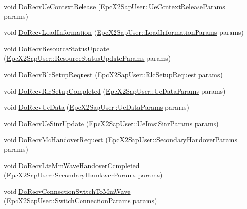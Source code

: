 \begin{DoxyCompactItemize}
\item 
void \hyperlink{classns3_1_1LteEnbRrc_acd8dc1935301185b71e736d04128d1fd}{Do\+Recv\+Ue\+Context\+Release} (\hyperlink{structns3_1_1EpcX2Sap_1_1UeContextReleaseParams}{Epc\+X2\+Sap\+User\+::\+Ue\+Context\+Release\+Params} params)
\item 
void \hyperlink{classns3_1_1LteEnbRrc_ad36a17ef9e85820d69f5499eba96cb77}{Do\+Recv\+Load\+Information} (\hyperlink{structns3_1_1EpcX2Sap_1_1LoadInformationParams}{Epc\+X2\+Sap\+User\+::\+Load\+Information\+Params} params)
\item 
void \hyperlink{classns3_1_1LteEnbRrc_a517db4a5ef935e5eeed76e6674b85c58}{Do\+Recv\+Resource\+Status\+Update} (\hyperlink{structns3_1_1EpcX2Sap_1_1ResourceStatusUpdateParams}{Epc\+X2\+Sap\+User\+::\+Resource\+Status\+Update\+Params} params)
\item 
void \hyperlink{classns3_1_1LteEnbRrc_a03259d4d0c4bfc816ef3c71ca0a84faf}{Do\+Recv\+Rlc\+Setup\+Request} (\hyperlink{structns3_1_1EpcX2Sap_1_1RlcSetupRequest}{Epc\+X2\+Sap\+User\+::\+Rlc\+Setup\+Request} params)
\item 
void \hyperlink{classns3_1_1LteEnbRrc_a26774965bd445cebd9703472d1e87cae}{Do\+Recv\+Rlc\+Setup\+Completed} (\hyperlink{structns3_1_1EpcX2Sap_1_1UeDataParams}{Epc\+X2\+Sap\+User\+::\+Ue\+Data\+Params} params)
\item 
void \hyperlink{classns3_1_1LteEnbRrc_abede7c6b2afbdc0d38b5fb14e5ac1cdb}{Do\+Recv\+Ue\+Data} (\hyperlink{structns3_1_1EpcX2Sap_1_1UeDataParams}{Epc\+X2\+Sap\+User\+::\+Ue\+Data\+Params} params)
\item 
void \hyperlink{classns3_1_1LteEnbRrc_a115b66a977332492cc0dd6c3703dea2c}{Do\+Recv\+Ue\+Sinr\+Update} (\hyperlink{structns3_1_1EpcX2Sap_1_1UeImsiSinrParams}{Epc\+X2\+Sap\+User\+::\+Ue\+Imsi\+Sinr\+Params} params)
\item 
void \hyperlink{classns3_1_1LteEnbRrc_a1726c953eb2ddff7947604a5aed4d958}{Do\+Recv\+Mc\+Handover\+Request} (\hyperlink{structns3_1_1EpcX2Sap_1_1SecondaryHandoverParams}{Epc\+X2\+Sap\+User\+::\+Secondary\+Handover\+Params} params)
\item 
void \hyperlink{classns3_1_1LteEnbRrc_a6fd84f6a43d2f9c030963aa74e3efb2a}{Do\+Recv\+Lte\+Mm\+Wave\+Handover\+Completed} (\hyperlink{structns3_1_1EpcX2Sap_1_1SecondaryHandoverParams}{Epc\+X2\+Sap\+User\+::\+Secondary\+Handover\+Params} params)
\item 
void \hyperlink{classns3_1_1LteEnbRrc_a9759cc14ab4b891826d0c896ff905eb4}{Do\+Recv\+Connection\+Switch\+To\+Mm\+Wave} (\hyperlink{structns3_1_1EpcX2Sap_1_1SwitchConnectionParams}{Epc\+X2\+Sap\+User\+::\+Switch\+Connection\+Params} params)

\end{DoxyCompactItemize}
